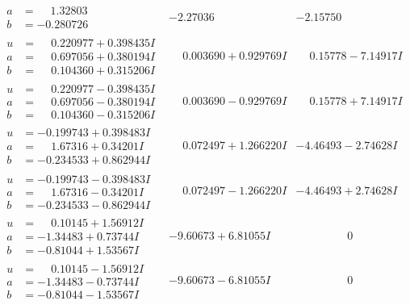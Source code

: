 \documentclass[1p]{elsarticle_modified}
\theoremstyle{definition}
\begin{document}
$$\begin{array}{c|c|c}
\begin{aligned}
a &= \phantom{-}1.32803\phantom{ +0.000000I} \\
b &= -0.280726\phantom{ +0.000000I}\end{aligned}
 & -2.27036\phantom{ +0.000000I} & -2.15750\phantom{ +0.000000I} \\ \hline\begin{aligned}
u &= \phantom{-}0.220977 + 0.398435 I \\
a &= \phantom{-}0.697056 + 0.380194 I \\
b &= \phantom{-}0.104360 + 0.315206 I\end{aligned}
 & \phantom{-}0.003690 + 0.929769 I & \phantom{-}0.15778 - 7.14917 I \\ \hline\begin{aligned}
u &= \phantom{-}0.220977 - 0.398435 I \\
a &= \phantom{-}0.697056 - 0.380194 I \\
b &= \phantom{-}0.104360 - 0.315206 I\end{aligned}
 & \phantom{-}0.003690 - 0.929769 I & \phantom{-}0.15778 + 7.14917 I \\ \hline\begin{aligned}
u &= -0.199743 + 0.398483 I \\
a &= \phantom{-}1.67316 + 0.34201 I \\
b &= -0.234533 + 0.862944 I\end{aligned}
 & \phantom{-}0.072497 + 1.266220 I & -4.46493 - 2.74628 I \\ \hline\begin{aligned}
u &= -0.199743 - 0.398483 I \\
a &= \phantom{-}1.67316 - 0.34201 I \\
b &= -0.234533 - 0.862944 I\end{aligned}
 & \phantom{-}0.072497 - 1.266220 I & -4.46493 + 2.74628 I \\ \hline\begin{aligned}
u &= \phantom{-}0.10145 + 1.56912 I \\
a &= -1.34483 + 0.73744 I \\
b &= -0.81044 + 1.53567 I\end{aligned}
 & -9.60673 + 6.81055 I & \phantom{-0.000000 } 0 \\ \hline\begin{aligned}
u &= \phantom{-}0.10145 - 1.56912 I \\
a &= -1.34483 - 0.73744 I \\
b &= -0.81044 - 1.53567 I\end{aligned}
 & -9.60673 - 6.81055 I & \phantom{-0.000000 } 0 \\ \hline\begin{aligned}

\end{aligned}
\end{array}$$
\end{document}
